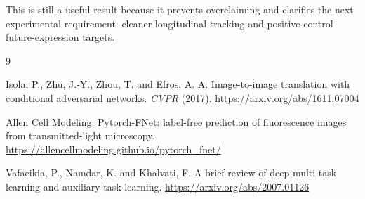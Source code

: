 \documentclass[11pt]{article}
\begin{document}
This is still a useful result because it prevents overclaiming and clarifies the next experimental requirement: cleaner longitudinal tracking and positive-control future-expression targets.

\begin{thebibliography}{9}

Isola, P., Zhu, J.-Y., Zhou, T. and Efros, A. A.
Image-to-image translation with conditional adversarial networks.
\textit{CVPR} (2017).
\url{https://arxiv.org/abs/1611.07004}

Allen Cell Modeling.
Pytorch-FNet: label-free prediction of fluorescence images from transmitted-light microscopy.
\url{https://allencellmodeling.github.io/pytorch_fnet/}

Vafaeikia, P., Namdar, K. and Khalvati, F.
A brief review of deep multi-task learning and auxiliary task learning.
\url{https://arxiv.org/abs/2007.01126}

\end{thebibliography}
\end{document}
